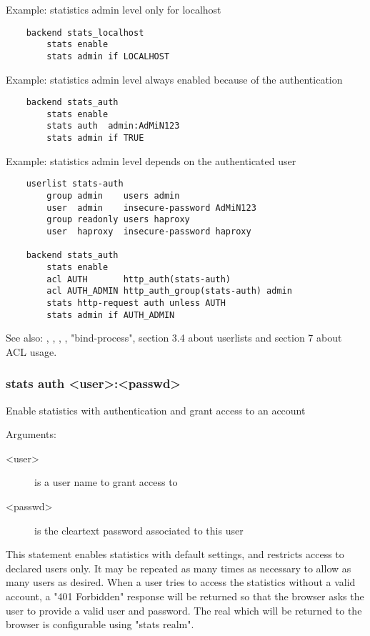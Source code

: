   Example: statistics admin level only for localhost
  \begin{verbatim}
    backend stats_localhost
        stats enable
        stats admin if LOCALHOST
  \end{verbatim}

  Example: statistics admin level always enabled because of the authentication
  \begin{verbatim}
    backend stats_auth
        stats enable
        stats auth  admin:AdMiN123
        stats admin if TRUE
  \end{verbatim}

  Example: statistics admin level depends on the authenticated user
  \begin{verbatim}
    userlist stats-auth
        group admin    users admin
        user  admin    insecure-password AdMiN123
        group readonly users haproxy
        user  haproxy  insecure-password haproxy

    backend stats_auth
        stats enable
        acl AUTH       http_auth(stats-auth)
        acl AUTH_ADMIN http_auth_group(stats-auth) admin
        stats http-request auth unless AUTH
        stats admin if AUTH_ADMIN
  \end{verbatim}

  See also: , , , ,
             "bind-process", section 3.4 about userlists and section 7 about
             ACL usage.

\subsubsection[stats auth]{stats auth <user>:<passwd>}


  Enable statistics with authentication and grant access to an account


  Arguments:
  \begin{description}
  \item[<user>] is a user name to grant access to
  \item[<passwd>] is the cleartext password associated to this user
  \end{description}

  This statement enables statistics with default settings, and restricts access
  to declared users only. It may be repeated as many times as necessary to
  allow as many users as desired. When a user tries to access the statistics
  without a valid account, a "401 Forbidden" response will be returned so that
  the browser asks the user to provide a valid user and password. The real
  which will be returned to the browser is configurable using "stats realm".

